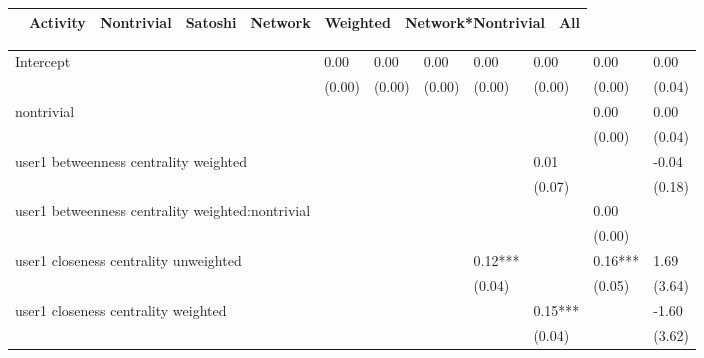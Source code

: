 \begin{table*}
\caption{Severity OR}
\begin{center}
\begin{tabular}{lccccccc}
\hline
                                                 & Activity & Nontrivial & Satoshi & Network & Weighted & Network*Nontrivial &     All       \\
\hline
\hline
\end{tabular}
\begin{tabular}{llllllll}
Intercept                                        & 0.00     & 0.00       & 0.00    & 0.00    & 0.00     & 0.00               & 0.00          \\
                                                 & (0.00)   & (0.00)     & (0.00)  & (0.00)  & (0.00)   & (0.00)             & (0.04)        \\
nontrivial                                       &          &            &         &         &          & 0.00               & 0.00          \\
                                                 &          &            &         &         &          & (0.00)             & (0.04)        \\
user1 betweenness centrality weighted            &          &            &         &         & 0.01     &                    & -0.04         \\
                                                 &          &            &         &         & (0.07)   &                    & (0.18)        \\
user1 betweenness centrality weighted:nontrivial &          &            &         &         &          & 0.00               &               \\
                                                 &          &            &         &         &          & (0.00)             &               \\
user1 closeness centrality unweighted            &          &            &         & 0.12*** &          & 0.16***            & 1.69          \\
                                                 &          &            &         & (0.04)  &          & (0.05)             & (3.64)        \\
user1 closeness centrality weighted              &          &            &         &         & 0.15***  &                    & -1.60         \\
                                                 &          &            &         &         & (0.04)   &                    & (3.62)        \\

\end{tabular}
\end{center}
\end{table*}
